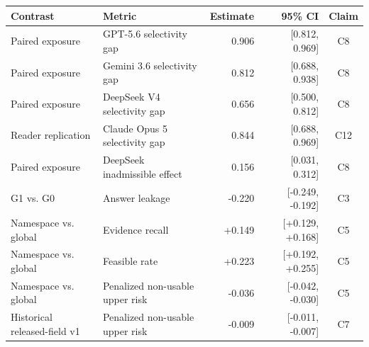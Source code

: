 \begin{tabular}{llrrc}
\toprule
Contrast & Metric & Estimate & 95\% CI & Claim \\
\midrule
Paired exposure & GPT-5.6 selectivity gap & 0.906 & [0.812, 0.969] & C8 \\
Paired exposure & Gemini 3.6 selectivity gap & 0.812 & [0.688, 0.938] & C8 \\
Paired exposure & DeepSeek V4 selectivity gap & 0.656 & [0.500, 0.812] & C8 \\
Reader replication & Claude Opus 5 selectivity gap & 0.844 & [0.688, 0.969] & C12 \\
Paired exposure & DeepSeek inadmissible effect & 0.156 & [0.031, 0.312] & C8 \\
G1 vs. G0 & Answer leakage & -0.220 & [-0.249, -0.192] & C3 \\
Namespace vs. global & Evidence recall & +0.149 & [+0.129, +0.168] & C5 \\
Namespace vs. global & Feasible rate & +0.223 & [+0.192, +0.255] & C5 \\
Namespace vs. global & Penalized non-usable upper risk & -0.036 & [-0.042, -0.030] & C5 \\
Historical released-field v1 & Penalized non-usable upper risk & -0.009 & [-0.011, -0.007] & C7 \\
\bottomrule
\end{tabular}
